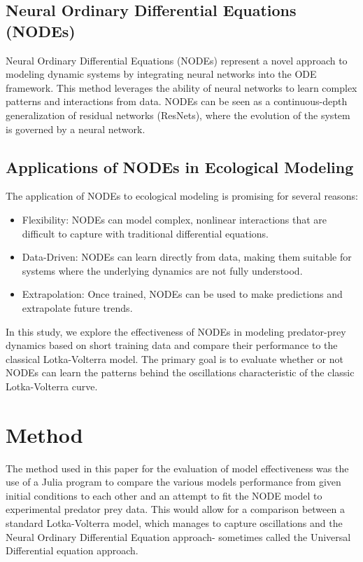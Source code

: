 \documentclass[twocolumn]{article}
\begin{document}
\subsection{Neural Ordinary Differential Equations (NODEs)}
Neural Ordinary Differential Equations (NODEs) represent a novel approach to modeling dynamic systems by integrating neural networks into the ODE framework. This method leverages the ability of neural networks to learn complex patterns and interactions from data. NODEs can be seen as a continuous-depth generalization of residual networks (ResNets), where the evolution of the system is governed by a neural network.

\subsection{Applications of NODEs in Ecological Modeling}
The application of NODEs to ecological modeling is promising for several reasons:
\begin{itemize}
    \item Flexibility: NODEs can model complex, nonlinear interactions that are difficult to capture with traditional differential equations.
    \item Data-Driven: NODEs can learn directly from data, making them suitable for systems where the underlying dynamics are not fully understood.
    \item Extrapolation: Once trained, NODEs can be used to make predictions and extrapolate future trends.
\end{itemize}

In this study, we explore the effectiveness of NODEs in modeling predator-prey dynamics based on short training data and compare their performance to the classical Lotka-Volterra model. The primary goal is to evaluate whether or not NODEs can learn the patterns behind the oscillations characteristic of the classic Lotka-Volterra curve.

\section{Method}
The method used in this paper for the evaluation of model effectiveness was the use of a Julia program to compare the various models performance from given initial conditions to each other and an attempt to fit the NODE model to experimental predator prey data. This would allow for a comparison between a standard Lotka-Volterra model, which manages to capture oscillations and the Neural Ordinary Differential Equation approach- sometimes called the Universal Differential equation approach. 
\end{document}
